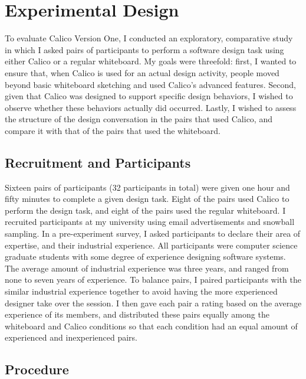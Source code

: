 \documentclass[12pt,fleqn]{ucithesis}
\begin{document}
\section{Experimental Design}
\label{experimentaldesign}

To evaluate Calico Version One, I conducted an exploratory, comparative study in which I asked pairs of participants to perform a software design task using either Calico or a regular whiteboard. My goals were threefold: first, I wanted to ensure that, when Calico is used for an actual design activity, people moved beyond basic whiteboard sketching and used Calico's advanced features. Second, given that Calico was designed to support specific design behaviors, I wished to observe whether these behaviors actually did occurred. Lastly, I wished to assess the structure of the design conversation in the pairs that used Calico, and compare it with that of the pairs that used the whiteboard.

\subsection {Recruitment and Participants}
\label{experimentaldesign:1}

Sixteen pairs of participants (32 participants in total) were given one hour and fifty minutes to complete a given design task. Eight of the pairs used Calico to perform the design task, and eight of the pairs used the regular whiteboard. 
I recruited participants at my university using email advertisements and snowball sampling. In a pre-experiment survey, I asked participants to declare their area of expertise, and their industrial experience. All participants were computer science graduate students with some degree of experience designing software systems. The average amount of industrial experience was three years, and ranged from none to seven years of experience. To balance pairs, I paired participants with the similar industrial experience together to avoid having the more experienced designer take over the session. I then gave each pair a rating based on the average experience of its members, and distributed these pairs equally among the whiteboard and Calico conditions so that each condition had an equal amount of experienced and inexperienced pairs.

\subsection {Procedure}
\label{experimentaldesign:2}
\end{document}
